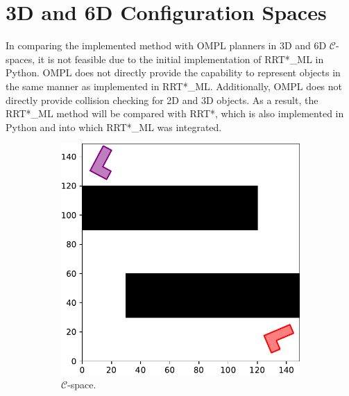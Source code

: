 \documentclass{ctuthesis}
\begin{document}
\section{3D and 6D Configuration Spaces}
In comparing the implemented method with OMPL planners in 3D and 6D $\mathcal{C}$-spaces, 
it is not feasible due to the initial implementation of RRT*\_ML in Python. 
OMPL does not directly provide the capability to represent objects in the same manner 
as implemented in RRT*\_ML. 
Additionally, OMPL does not directly provide collision checking for 2D and 3D objects.
As a result, 
the RRT*\_ML method will be compared with RRT*, 
which is also implemented in Python and into which RRT*\_ML was integrated.
\begin{figure}[!ht]
  \centering 
  \begin{subfigure}[t]{0.49\textwidth}
      \includegraphics[width=\textwidth]{figChap5/Maze_E_2D.pdf}
      \caption{$\mathcal{C}$-space.}
      \label{fig:maze_E_2D_Cspace} 
  \end{subfigure}
  \begin{subfigure}[t]{0.49\textwidth}

\end{subfigure}
\end{figure}
\end{document}
